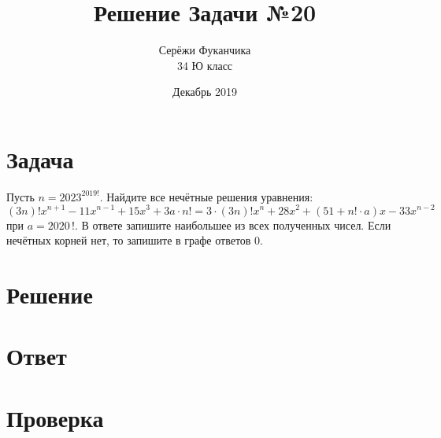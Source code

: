\documentclass{article}
\title{Решение Задачи №20}
\author{Серёжи Фуканчика\\34 Ю класс}
\date{Декабрь 2019}
\begin{document}
\maketitle

\section{Задача}
Пусть $n=2023^{2019!}$. Найдите все нечётные решения уравнения:
$$(3n)!x^{n+1}-11x^{n-1}+15x^3+3a\cdot{}n!=3\cdot{}(3n)!x^n+28x^2+(51+n!\cdot{}a)x-33x^{n-2}$$
при $a={2020\,!}$. В ответе запишите наибольшее из всех полученных чисел. Если нечётных корней нет, то запишите в графе ответов $0$.

\section{Решение}

\section{Ответ}

\section{Проверка}
\end{document}
